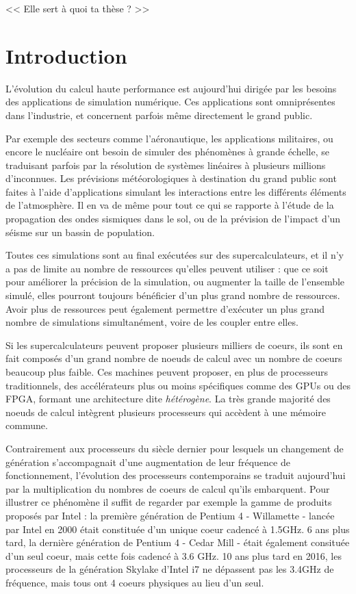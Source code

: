 \begin{savequote}[6cm]
<< Elle sert à quoi ta thèse ?  >>

\end{savequote}
\chapter{Introduction}
\chaptertoc

L'évolution du calcul haute performance est aujourd'hui dirigée par les besoins des applications de simulation numérique.
Ces applications sont omniprésentes dans l'industrie, et concernent parfois même directement le grand public.

Par exemple des secteurs comme l'aéronautique, les applications militaires, ou encore le nucléaire ont besoin de simuler des phénomènes à grande échelle, se traduisant parfois par la résolution de systèmes linéaires à plusieurs millions d'inconnues.
Les prévisions météorologiques à destination du grand public sont faites à l'aide d'applications simulant les interactions entre les différents éléments de l'atmosphère.
Il en va de même pour tout ce qui se rapporte à l'étude de la propagation des ondes sismiques dans le sol, ou de la prévision de l'impact d'un séisme sur un bassin de population.

Toutes ces simulations sont au final exécutées sur des supercalculateurs, et il n'y a pas de limite au nombre de ressources qu'elles peuvent utiliser : que ce soit pour améliorer la précision de la simulation, ou augmenter la taille de l'ensemble simulé, elles pourront toujours bénéficier d'un plus grand nombre de ressources.
Avoir plus de ressources peut également permettre d'exécuter un plus grand nombre de simulations simultanément, voire de les coupler entre elles.

Si les supercalculateurs peuvent proposer plusieurs milliers de coeurs, ils sont en fait composés d'un grand nombre de noeuds de calcul avec un nombre de coeurs beaucoup plus faible.
Ces machines peuvent proposer, en plus de processeurs traditionnels, des accélérateurs plus ou moins spécifiques comme des GPUs ou des FPGA, formant une architecture dite \emph{hétérogène}.
La très grande majorité des noeuds de calcul intègrent plusieurs processeurs qui accèdent à une mémoire commune.

Contrairement aux processeurs du siècle dernier pour lesquels un changement de génération s'accompagnait d'une augmentation de leur fréquence de fonctionnement, l'évolution des processeurs contemporains se traduit aujourd'hui par la multiplication du nombres de coeurs de calcul qu'ils embarquent.
Pour illustrer ce phénomène il suffit de regarder par exemple la gamme de produits proposés par Intel : la première génération de Pentium 4 - Willamette - lancée par Intel en 2000 était constituée d'un unique coeur cadencé à 1.5GHz. 6 ans plus tard, la dernière génération de Pentium 4 - Cedar Mill - était également consituée d'un seul coeur, mais cette fois cadencé à 3.6 GHz. 10 ans plus tard en 2016, les processeurs de la génération Skylake d'Intel i7 ne dépassent pas les 3.4GHz de fréquence, mais tous ont 4 coeurs physiques au lieu d'un seul.

